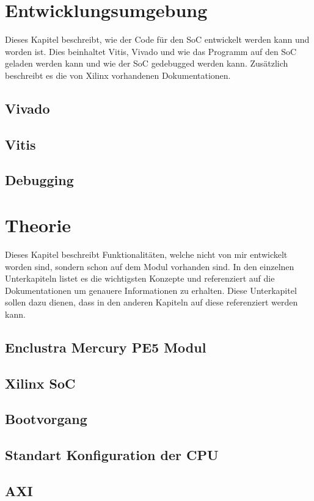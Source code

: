 \documentclass{article}
\begin{document}
\section{Entwicklungsumgebung}
Dieses Kapitel beschreibt, wie der Code für den SoC entwickelt werden kann und worden ist. Dies beinhaltet Vitis, Vivado und wie das Programm auf den SoC geladen werden kann und wie der SoC gedebugged werden kann. Zusätzlich beschreibt es die von Xilinx vorhandenen Dokumentationen.
\subsection{Vivado}
\subsection{Vitis}
\subsection{Debugging}


\section{Theorie}
Dieses Kapitel beschreibt Funktionalitäten, welche nicht von mir entwickelt worden sind, sondern schon auf dem Modul vorhanden sind. In den einzelnen Unterkapiteln listet es die wichtigsten Konzepte und referenziert auf die Dokumentationen um genauere Informationen zu erhalten. Diese Unterkapitel sollen dazu dienen, dass in den anderen Kapiteln auf diese referenziert werden kann.
\subsection{Enclustra Mercury PE5 Modul}
\subsection{Xilinx SoC}
\subsection{Bootvorgang}
\subsection{Standart Konfiguration der CPU}
\subsection{AXI}
\end{document}
